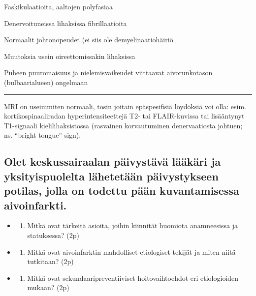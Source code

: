 \documentclass[
]{book}
\providecommand{\tightlist}{%
  \setlength{\itemsep}{0pt}\setlength{\parskip}{0pt}}
\begin{document}
Faskikulaatioita, aaltojen polyfasiaa

Denervoituneissa lihaksissa fibrillaatioita

Normaalit johtonopeudet (ei siis ole demyelinaatiohäiriö

Muutoksia usein oireettomissakin lihaksissa

Puheen puuromaisuus ja nielemisvaikeudet viittaavat aivorunkotason (bulbaarialueen) ongelmaan

\begin{center}\rule{0.5\linewidth}{0.5pt}\end{center}

MRI on useimmiten normaali, tosin joitain epäspesifisiä löydöksiä voi olla: esim. kortikospinaaliradan hyperintensiteettejä T2- tai FLAIR-kuvissa tai lisääntynyt T1-signaali kielilihaksistossa (rasvainen korvautuminen denervaatiosta johtuen; ns. ``bright tongue'' sign).

\subsection{Olet keskussairaalan päivystävä lääkäri ja yksityispuolelta lähetetään päivystykseen potilas, jolla on todettu pään kuvantamisessa aivoinfarkti.}\label{olet-keskussairaalan-puxe4ivystuxe4vuxe4-luxe4uxe4kuxe4ri-ja-yksityispuolelta-luxe4hetetuxe4uxe4n-puxe4ivystykseen-potilas-jolla-on-todettu-puxe4uxe4n-kuvantamisessa-aivoinfarkti.}

\begin{itemize}
\tightlist
\item
  \begin{enumerate}
  \def\labelenumi{\alph{enumi}.}
  \tightlist
  \item
    Mitkä ovat tärkeitä asioita, joihin kiinnität huomiota anamneesissa ja statuksessa? (2p)
  \end{enumerate}
\item
  \begin{enumerate}
  \def\labelenumi{\alph{enumi}.}
  \setcounter{enumi}{1}
  \tightlist
  \item
    Mitkä ovat aivoinfarktin mahdolliset etiologiset tekijät ja miten niitä tutkitaan? (2p)
  \end{enumerate}
\item
  \begin{enumerate}
  \def\labelenumi{\alph{enumi}.}
  \setcounter{enumi}{2}
  \tightlist
  \item
    Mitkä ovat sekundaaripreventiiviset hoitovaihtoehdot eri etiologioiden mukaan? (2p)
  \end{enumerate}
\end{itemize}
\end{document}
